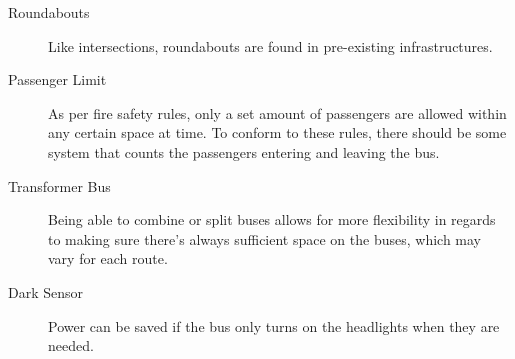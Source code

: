 \begin{description}
\item[Roundabouts]
Like intersections, roundabouts are found in pre-existing infrastructures.

\item[Passenger Limit]
As per fire safety rules, only a set amount of passengers are allowed within any certain space at time. To conform to these rules, there should be some system that counts the passengers entering and leaving the bus.

\item[Transformer Bus]
Being able to combine or split buses allows for more flexibility in regards to making sure there's always sufficient space on the buses, which may vary for each route. 

\item[Dark Sensor]
Power can be saved if the bus only turns on the headlights when they are needed.

\end{description}













